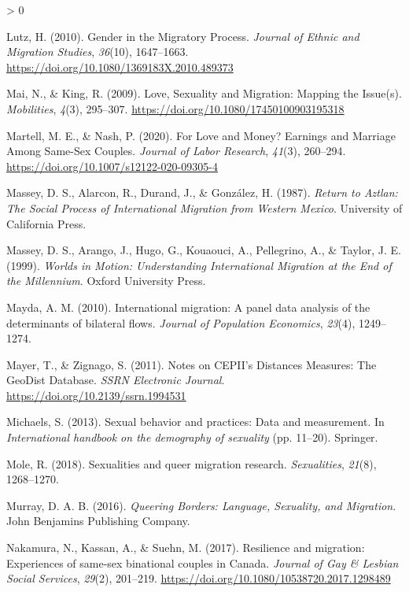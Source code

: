 \documentclass[
  11pt,
]{article}
\newlength{\cslhangindent}
\newenvironment{CSLReferences}[2] %
 {%
  \setlength{\parindent}{0pt}
  \ifodd #1 \everypar{\setlength{\hangindent}{\cslhangindent}}\ignorespaces\fi
  \ifnum #2 > 0
  \setlength{\parskip}{#2\baselineskip}
  \fi
 }%
 {}
\begin{document}
\begin{CSLReferences}{1}{0}
\leavevmode\hypertarget{ref-lutz_2010}{}%
Lutz, H. (2010). Gender in the {Migratory Process}. \emph{Journal of Ethnic and Migration Studies}, \emph{36}(10), 1647--1663. \url{https://doi.org/10.1080/1369183X.2010.489373}

\leavevmode\hypertarget{ref-mai_2009}{}%
Mai, N., \& King, R. (2009). Love, {Sexuality} and {Migration}: {Mapping} the {Issue}(s). \emph{Mobilities}, \emph{4}(3), 295--307. \url{https://doi.org/10.1080/17450100903195318}

\leavevmode\hypertarget{ref-martell_2020}{}%
Martell, M. E., \& Nash, P. (2020). For {Love} and {Money}? {Earnings} and {Marriage Among Same}-{Sex Couples}. \emph{Journal of Labor Research}, \emph{41}(3), 260--294. \url{https://doi.org/10.1007/s12122-020-09305-4}

\leavevmode\hypertarget{ref-massey_1987}{}%
Massey, D. S., Alarcon, R., Durand, J., \& González, H. (1987). \emph{Return to {Aztlan}: {The Social Process} of {International Migration} from {Western Mexico}}. {University of California Press}.

\leavevmode\hypertarget{ref-massey_1999}{}%
Massey, D. S., Arango, J., Hugo, G., Kouaouci, A., Pellegrino, A., \& Taylor, J. E. (1999). \emph{Worlds in {Motion}: {Understanding International Migration} at the {End} of the {Millennium}}. {Oxford University Press}.

\leavevmode\hypertarget{ref-mayda_2010}{}%
Mayda, A. M. (2010). International migration: A panel data analysis of the determinants of bilateral flows. \emph{Journal of Population Economics}, \emph{23}(4), 1249--1274.

\leavevmode\hypertarget{ref-mayer_2011}{}%
Mayer, T., \& Zignago, S. (2011). Notes on {CEPII}'s {Distances Measures}: {The GeoDist Database}. \emph{SSRN Electronic Journal}. \url{https://doi.org/10.2139/ssrn.1994531}

\leavevmode\hypertarget{ref-michaels_2013}{}%
Michaels, S. (2013). Sexual behavior and practices: {Data} and measurement. In \emph{International handbook on the demography of sexuality} (pp. 11--20). {Springer}.

\leavevmode\hypertarget{ref-mole_2018a}{}%
Mole, R. (2018). Sexualities and queer migration research. \emph{Sexualities}, \emph{21}(8), 1268--1270.

\leavevmode\hypertarget{ref-murray_2016}{}%
Murray, D. A. B. (2016). \emph{Queering {Borders}: {Language}, {Sexuality}, and {Migration}}. {John Benjamins Publishing Company}.

\leavevmode\hypertarget{ref-nakamura_2017}{}%
Nakamura, N., Kassan, A., \& Suehn, M. (2017). Resilience and migration: {Experiences} of same-sex binational couples in {Canada}. \emph{Journal of Gay \& Lesbian Social Services}, \emph{29}(2), 201--219. \url{https://doi.org/10.1080/10538720.2017.1298489}


\end{CSLReferences}
\end{document}
